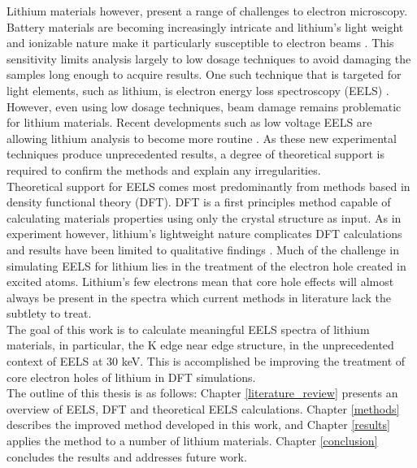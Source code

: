 Lithium materials however, present a range of challenges to electron microscopy.  Battery materials are becoming increasingly intricate and lithium's light weight and ionizable nature make it particularly susceptible to electron beams \cite{kobayashi_quantitative_2017}.  This sensitivity limits analysis largely to low dosage techniques to avoid damaging the samples long enough to acquire results.  One such technique that is targeted for light elements, such as lithium, is electron energy loss spectroscopy (EELS) \cite{Egerton}.  However, even using low dosage techniques,  beam damage remains problematic for lithium materials.  Recent developments such as low voltage EELS are allowing lithium analysis to become more routine \cite{SU_9000}. As these new experimental techniques produce unprecedented results, a degree of theoretical support is required to confirm the methods and explain any irregularities.  
\\

Theoretical support for EELS  comes most predominantly from methods based in density functional theory (DFT). DFT is a first principles method capable of calculating materials properties using only the crystal structure as input.  As in experiment however, lithium's lightweight nature complicates DFT calculations and results have been limited to qualitative findings \cite{mauchamp_ab_2006, mauchamp_local_2008}. Much of the challenge in simulating EELS for lithium lies in the treatment of the electron hole created in excited atoms.  Lithium's few electrons mean that core hole effects will almost always be present in the spectra which current methods in literature lack the subtlety to treat. \\

The goal of this work is to calculate meaningful EELS spectra of lithium materials, in particular, the K edge near edge structure, in the unprecedented context of EELS at 30 keV. This is accomplished be improving the treatment of core electron holes of lithium in DFT simulations. \\

The outline of this thesis is as follows: Chapter \ref{literature_review} presents an overview of EELS, DFT and theoretical EELS calculations.  Chapter \ref{methods} describes the improved method developed in this work, and Chapter \ref{results} applies the method to a number of lithium materials.  Chapter \ref{conclusion} concludes the results and addresses future work.



